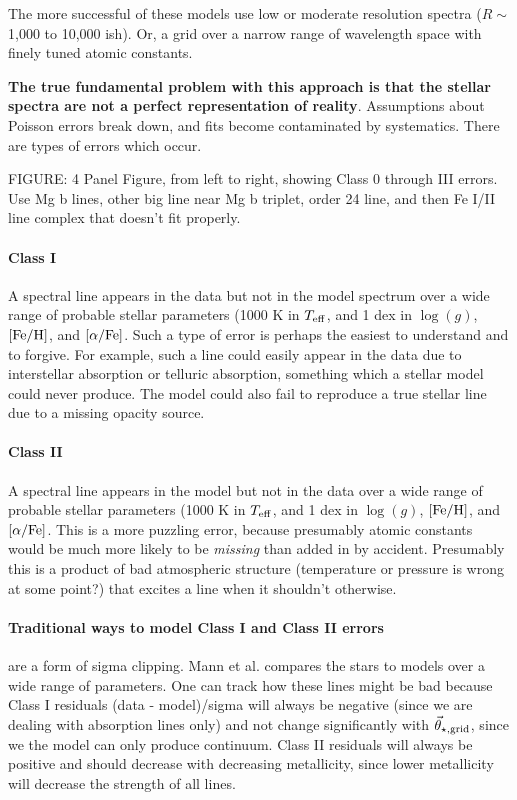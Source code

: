 \documentclass[preprint]{aastex} %
\newcommand{\vt}{\vec{\theta}}
\newcommand{\vg}{\vt_{\star, {\rm grid}}}
\newcommand{\Z}{[{\rm Fe}/{\rm H}]}
\newcommand{\A}{[\alpha/{\rm Fe}]}
\begin{document}
The more successful of these models use low or moderate resolution spectra ($R \sim$ 1,000 to 10,000 ish). Or, a grid over a narrow range of wavelength space with finely tuned atomic constants.

\textbf{The true fundamental problem with this approach is that the stellar spectra are not a perfect representation of reality}. Assumptions about Poisson errors break down, and fits become contaminated by systematics. There are types of errors which occur.

FIGURE: 4 Panel Figure, from left to right, showing Class 0 through III errors. Use Mg b lines, other big line near Mg b triplet, order 24 line, and then Fe I/II line complex that doesn't fit properly.

\paragraph{Class I} A spectral line appears in the data but not in the model spectrum over a wide range of probable stellar parameters (1000 K in $T_{\rm eff}$, and 1 dex in $\log(g)$, $\Z$, and $\A$. Such a type of error is perhaps the easiest to understand and to forgive. For example, such a line could easily appear in the data due to interstellar absorption or telluric absorption, something which a stellar model could never produce. The model could also fail to reproduce a true stellar line due to a missing opacity source.

\paragraph{Class II} A spectral line appears in the model but not in the data over a wide range of probable stellar parameters (1000 K in $T_{\rm eff}$, and 1 dex in $\log(g)$, $\Z$, and $\A$. This is a more puzzling error, because presumably atomic constants would be much more likely to be \emph{missing} than added in by accident. Presumably this is a product of bad atmospheric structure (temperature or pressure is wrong at some point?) that excites a line when it shouldn't otherwise.

\paragraph{Traditional ways to model Class I and Class II errors} are a form of sigma clipping. Mann et al. compares the stars to models over a wide range of parameters. One can track how these lines might be bad because Class I residuals (data - model)/sigma will always be negative (since we are dealing with absorption lines only) and not change significantly with $\vg$, since we the model can only produce continuum. Class II residuals will always be positive and should decrease with decreasing metallicity, since lower metallicity will decrease the strength of all lines.
\end{document}
